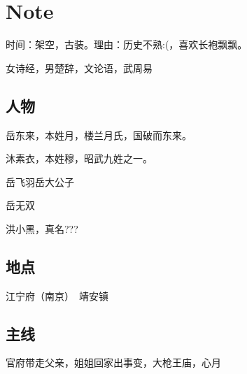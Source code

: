 
\chapter{Note}
\label{note}

时间：架空，古装。理由：历史不熟:(，喜欢长袍飘飘。

女诗经，男楚辞，文论语，武周易

\section{人物}
\label{sec:characters}


岳东来，本姓月，楼兰月氏，国破而东来。

沐素衣，本姓穆，昭武九姓之一。

岳飞羽岳大公子

岳无双

洪小黑，真名???

\section{地点}
\label{sec:place}

江宁府（南京）　靖安镇

\section{主线}
\label{sec:main-story}

官府带走父亲，姐姐回家出事变，大枪王庙，心月